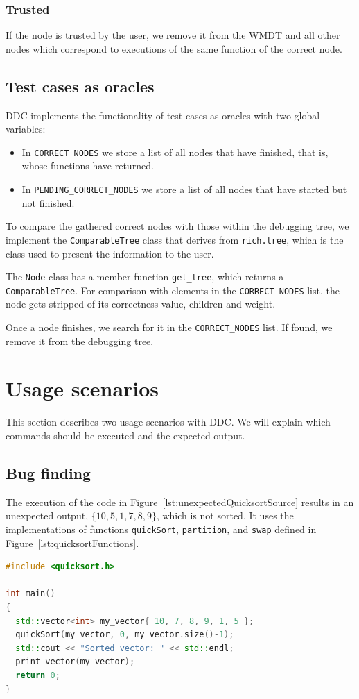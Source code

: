 \subsubsection{Trusted}
If the node is trusted by the user, we remove it from the WMDT and all other nodes which correspond to executions of the same function of the correct node.


\subsection{Test cases as oracles}
DDC implements the functionality of test cases as oracles with two global variables:

\begin{itemize}
    \item In \verb|CORRECT_NODES| we store a list of all nodes that have finished, that is, whose functions have returned.
    \item In \verb|PENDING_CORRECT_NODES| we store a list of all nodes that have started but not finished.
\end{itemize}

To compare the gathered correct nodes with those within the debugging tree, we implement the \verb|ComparableTree| class that derives from \verb|rich.tree|, which is the class used to present the information to the user.

The \verb|Node| class has a member function \verb|get_tree|, which returns a \verb|ComparableTree|.
For comparison with elements in the \verb|CORRECT_NODES| list, the node gets stripped of its correctness value, children and weight.

Once a node finishes, we search for it in the \verb|CORRECT_NODES| list. If found, we remove it from the debugging tree.

\section{Usage scenarios}
This section describes two usage scenarios with DDC.
We will explain which commands should be executed and the expected output.

\subsection{Bug finding}
The execution of the code in Figure~\ref{lst:unexpectedQuicksortSource} results in an unexpected output, \(\{10, 5, 1, 7, 8, 9\}\), which is not sorted.
It uses the implementations of functions \verb|quickSort|, \verb|partition|, and \verb|swap| defined in Figure~\ref{lst:quicksortFunctions}.
\begin{lstlisting}[language=C++, caption={Code that results in unexpected output}, frame=tb, label={lst:unexpectedQuicksortSource}]
#include <quicksort.h>

int main()
{
  std::vector<int> my_vector{ 10, 7, 8, 9, 1, 5 };
  quickSort(my_vector, 0, my_vector.size()-1);
  std::cout << "Sorted vector: " << std::endl;
  print_vector(my_vector);
  return 0;
}
\end{lstlisting}

